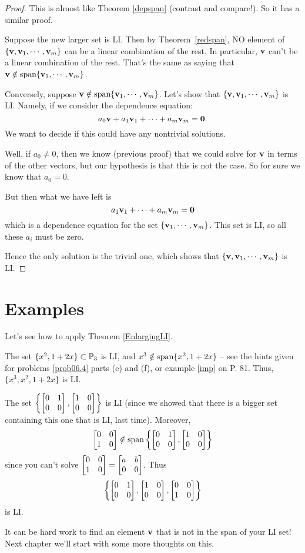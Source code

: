 \begin{proof}
This is almost like Theorem \ref{depspan} (contrast and compare!).
So it has a similar proof.

Suppose the new larger set is LI.  Then by Theorem~\ref{redspan},
NO element of $\{\mathbf{v}, \mathbf{v}_1, \cdots, \mathbf{v}_m\}$ can be a linear
combination of the rest.  In particular, $\mathbf{v}$ can't be a
linear combination of the rest.  That's the same as saying that
$\mathbf{v} \notin \textrm{span}\{\mathbf{v}_1, \cdots, \mathbf{v}_m\}$.

Conversely, suppose $\mathbf{v}  \notin \textrm{span}\{\mathbf{v}_1, \cdots, \mathbf{v}_m\}$.
Let's show that $\{\mathbf{v}, \mathbf{v}_1, \cdots, \mathbf{v}_m\}$ is LI.  Namely,
if we consider the dependence equation:
$$
a_0\mathbf{v} + a_1\mathbf{v}_1 + \cdots + a_m\mathbf{v}_m = \mathbf{0}.
$$
We want to decide if this could have any nontrivial solutions.

Well, if $a_0 \neq 0$, then we know (previous proof) that we
could solve for $\mathbf{v}$ in terms of the other vectors, but our
hypothesis is that this is not the case.  So for sure we know
that $a_0 = 0$.  

But then what we have left is
$$
a_1\mathbf{v}_1 + \cdots + a_m\mathbf{v}_m = \mathbf{0}
$$
which is a dependence equation for the set $\{\mathbf{v}_1, \cdots,\mathbf{v}_m\}$.
This set
is LI, so all these $a_i$ must be zero.

Hence the only solution is the trivial
one, which shows that $\{\mathbf{v}, \mathbf{v}_1, \cdots, \mathbf{v}_m\}$ is LI.
\end{proof}


\section{Examples} Let's see how to apply Theorem \ref{EnlargingLI}.

\begin{myexample} The set $\{ x^2, 1+2x\} \subset \mathbb{P}_3$ is LI, and $x^3 \notin \textrm{span}\{ x^2, 1+2x\}$  -- see the hints given for problems \ref{prob06.4} parts (e) and (f), or  example \ref{imp} on P. 81.    Thus,  
$\{ x^3, x^2, 1+2x \}$ is LI. \end{myexample}

\begin{myexample} The set $\left\{ \left[ \begin{matrix} 0 & 1 \\ 0 & 0 \end{matrix} \right], \left[ \begin{matrix} 1 & 0 \\ 0 & 0 \end{matrix} \right] \right\}$
is LI (since we showed that there is a bigger set containing this one that
is LI, last time).   Moreover, 
$$
\left[ \begin{matrix} 0 & 0 \\ 1 & 0 \end{matrix} \right] \notin \textrm{span}\left\{ \left[ \begin{matrix} 0 & 1 \\ 0 & 0 \end{matrix} \right], \left[ \begin{matrix} 1 & 0 \\ 0 & 0 \end{matrix} \right] \right\}
$$
since you can't solve $\left[ \begin{matrix} 0 & 0 \\ 1 & 0 \end{matrix} \right] = \left[ \begin{matrix} a & b\\0 & 0 \end{matrix} \right]$.
Thus
$$
\left\{ \left[ \begin{matrix} 0 & 1 \\ 0 & 0 \end{matrix} \right], \left[ \begin{matrix} 1 & 0 \\ 0 & 0 \end{matrix} \right], \left[ \begin{matrix} 0 & 0 \\ 1 & 0 \end{matrix} \right] \right\}
$$
is LI. \end{myexample}

It can be hard work to find an element $\mathbf{v}$ that is not in the
span of your LI set!  Next chapter we'll start with some more thoughts
on this.





